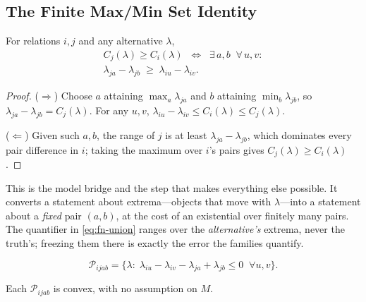 \subsection{The Finite Max/Min Set Identity}
\label{sec:fn-union}

\begin{theorem}
\label{thm:fn-union}
For relations $i,j$ and any alternative $\lambda$,
\begin{multline}
C_{j}(\lambda)\geq C_{i}(\lambda)
\;\;\Longleftrightarrow\;\;
\exists\,a,b\;\;\forall\,u,v:\\
\lambda_{ja}-\lambda_{jb}\;\geq\;\lambda_{iu}-\lambda_{iv}.
\label{eq:fn-union}
\end{multline}
\end{theorem}

\begin{proof}
($\Rightarrow$) Choose $a$ attaining $\max_{a}\lambda_{ja}$ and $b$ attaining
$\min_{b}\lambda_{jb}$, so $\lambda_{ja}-\lambda_{jb}=C_{j}(\lambda)$. For any $u,v$,
$\lambda_{iu}-\lambda_{iv}\le C_{i}(\lambda)\le C_{j}(\lambda)$.

($\Leftarrow$) Given such $a,b$, the range of $j$ is at least $\lambda_{ja}-\lambda_{jb}$,
which dominates every pair difference in $i$; taking the maximum over $i$'s pairs gives
$C_{j}(\lambda)\ge C_{i}(\lambda)$.
\end{proof}


This is the model bridge and the step that makes everything else possible. It converts a
statement about extrema---objects that move with $\lambda$---into a statement about a
\emph{fixed} pair $(a,b)$, at the cost of an existential over finitely many pairs. The
quantifier in \eqref{eq:fn-union} ranges over the \emph{alternative's} extrema, never the
truth's; freezing them there is exactly the error the families quantify.

\begin{definition}
\begin{equation}
\mathcal{P}_{ijab}=\bigl\{\lambda:\;
\lambda_{iu}-\lambda_{iv}-\lambda_{ja}+\lambda_{jb}\leq 0
\;\;\forall u,v\bigr\}.
\label{eq:fn-polyhedron}
\end{equation}
\end{definition}

\begin{proposition}
\label{prop:fn-convex}
Each $\mathcal{P}_{ijab}$ is convex, with no assumption on $M$.
\end{proposition}

